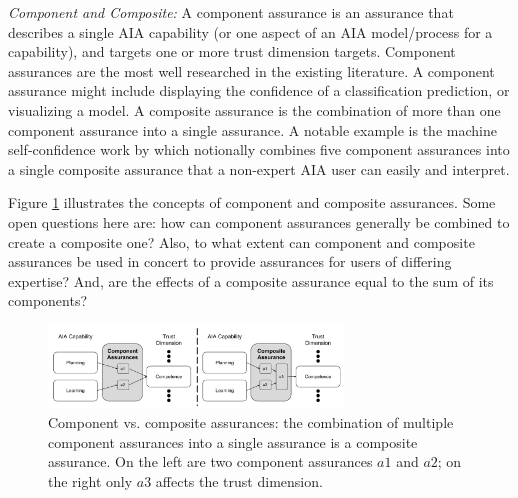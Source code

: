 \emph{Component and Composite:}
A component assurance is an assurance that describes a single AIA capability (or one aspect of an AIA model/process for a capability), and targets one or more trust dimension targets.  Component assurances are the most well researched in the existing literature. A component assurance might include displaying the confidence of a classification prediction, or visualizing a model. A composite assurance is the combination of more than one component assurance into a single assurance. 
A notable example is the machine self-confidence work by \citet{Aitken2016-cv} which notionally combines five component assurances into a single composite assurance that a non-expert AIA user can easily and interpret. 

Figure \ref{fig:assurance_mapping} illustrates the concepts of component and composite assurances. Some open questions here are: how can component assurances generally be combined to create a composite one? Also, to what extent can component and composite assurances be used in concert to provide assurances for users of differing expertise? And, are the effects of a composite assurance equal to the sum of its components?

\begin{figure}[!htbp]
    \centering
    \includegraphics[width=0.7\textwidth]{Figures/Assurance_component_composite.pdf}
    \caption{
    Component vs. composite assurances: the combination of multiple component assurances into a single assurance is a composite assurance. On the left are two component assurances $a1$ and $a2$; on the right only $a3$ affects the trust dimension.}
    \label{fig:assurance_mapping}
    \vspace{-0.2 in}
\end{figure}
